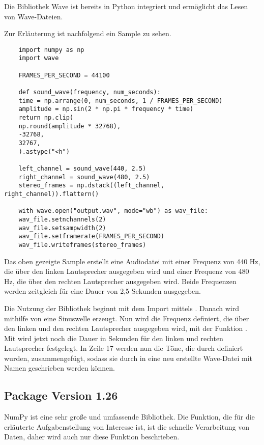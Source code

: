 Die Bibliothek Wave ist bereits in Python integriert und ermöglicht das Lesen von Wave-Dateien.  

Zur Erläuterung ist nachfolgend ein Sample zu sehen. 

\begin{verbatim}
    import numpy as np
    import wave
    
    FRAMES_PER_SECOND = 44100
    
    def sound_wave(frequency, num_seconds):
    time = np.arrange(0, num_seconds, 1 / FRAMES_PER_SECOND)
    amplitude = np.sin(2 * np.pi * frequency * time)
    return np.clip(
    np.round(amplitude * 32768),
    -32768,
    32767,
    ).astype("<h")
    
    left_channel = sound_wave(440, 2.5)
    right_channel = sound_wave(480, 2.5)
    stereo_frames = np.dstack((left_channel, right_channel)).flattern()
    
    with wave.open("output.wav", mode="wb") as wav_file:
    wav_file.setnchannels(2)
    wav_file.setsampwidth(2)
    wav_file.setframerate(FRAMES_PER_SECOND)
    wav_file.writeframes(stereo_frames)
\end{verbatim}

Das oben gezeigte Sample erstellt eine Audiodatei mit einer Frequenz von 440 Hz, die über den linken Lautsprecher ausgegeben wird und einer Frequenz von 480 Hz, die über den rechten Lautsprecher ausgegeben wird. Beide Frequenzen werden zeitgleich für eine Dauer von 2,5 Sekunden ausgegeben.  

Die Nutzung der Bibliothek  beginnt mit dem Import mittels . Danach wird mithilfe von  eine Sinuswelle erzeugt. Nun wird die Frequenz definiert, die über den linken und den rechten Lautsprecher ausgegeben wird, mit der Funktion . Mit  wird jetzt noch die Dauer in Sekunden für den linken und rechten Lautsprecher festgelegt. In Zeile 17 werden nun die Töne, die durch  definiert wurden, zusammengefügt, sodass sie durch  in eine neu erstellte Wave-Datei mit Namen  geschrieben werden können. \cite{Python:2024Wave}

\subsection{Package  Version 1.26}

NumPy ist eine sehr große und umfassende Bibliothek. Die Funktion, die für die erläuterte Aufgabenstellung von Interesse ist, ist die schnelle Verarbeitung von Daten, daher wird auch nur diese Funktion beschrieben.


